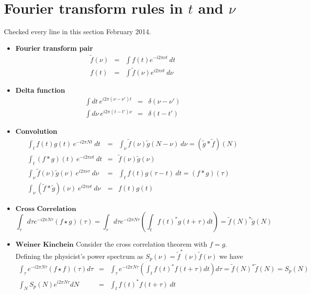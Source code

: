 \documentclass{article}
\begin{document}
\section*{Fourier transform rules in $t$ and $\nu$}

Checked every line in this section February 2014.

\begin{itemize}
\item \textbf{Fourier transform pair} \begin{eqnarray*}
\tilde{f}(\nu) & = & \int f(t)e^{-i2\pi\nu t}~dt\\
f(t) & = & \int\tilde{f}(\nu)e^{i2\pi\nu t}~d\nu\end{eqnarray*}

\item \textbf{Delta function} \begin{eqnarray*}
\int dt\: e^{i2\pi(\nu-\nu')t} & = & \delta(\nu-\nu')\\
\int d\nu\: e^{i2\pi(t-t')\nu} & = & \delta(t-t')\end{eqnarray*}

\item \textbf{Convolution} \begin{eqnarray*}
\int_{t}f(t)g(t)~e^{-i2\pi Nt}~dt & = & \int_{\nu}\tilde{f}(\nu)\tilde{g}(N-\nu)~d\nu=(\tilde{g}*\tilde{f})(N)\\
\int_{t}(f*g)(t)~e^{-i2\pi\nu t}~dt & = & \tilde{f}(\nu)\tilde{g}(\nu)\\
\int_{\nu}\tilde{f}(\nu)\tilde{g}(\nu)~e^{i2\pi\nu\tau}~d\nu & = & \int_{t}f(t)g(\tau-t)~dt=(f*g)(\tau)\\
\int_{\nu}(\tilde{f}*\tilde{g})(\nu)~e^{i2\pi\nu t}~d\nu & = & f(t)g(t)\end{eqnarray*}

\item $\textbf{Cross Correlation}$\[
\int_{\tau}d\tau e^{-i2\pi N\tau}\left(f\star g\right)(\tau)=\int_{\tau}d\tau e^{-i2\pi N\tau}\left(\int_{t}f(t)^{*}g(t+\tau)dt\right)=\tilde{f}(N)^{*}\tilde{g}(N)\]

\item $\textbf{Weiner Kinchein}$ Consider the cross correlation theorem
with $f=g$. Defining the physicist's power spectrum as $S_{p}(\nu)=\tilde{f}^{*}(\nu)\tilde{f}(\nu)$
we have\begin{eqnarray*}
\int_{\tau}e^{-i2\pi N\tau}(f\star f)(\tau)d\tau & = & \int_{\tau}e^{-i2\pi N\tau}\left(\int_{t}f(t)^{*}f(t+\tau)dt\right)d\tau=\tilde{f}(N)^{*}\tilde{f}(N)=S_{p}(N)\\
\int_{N}S_{p}(N)e^{i2\pi N\tau}dN & = & \int_{t}f(t)^{*}f(t+\tau)\: dt\end{eqnarray*}
\end{itemize}
\end{document}
